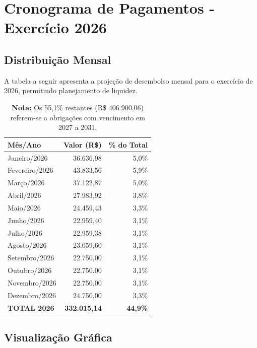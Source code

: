 \documentclass[12pt, a4paper]{article}
\newcommand{\reais}[1]{R\$ #1}
\begin{document}
\newpage

\section{Cronograma de Pagamentos - Exercício 2026}

\subsection{Distribuição Mensal}

A tabela a seguir apresenta a projeção de desembolso mensal para o exercício de 2026, permitindo planejamento de liquidez.

\begin{table}[H]
    \centering
    \renewcommand{\arraystretch}{1.3}
    \begin{tabularx}{0.85\textwidth}{X r r}
        \toprule
        \rowcolor{tableHeader} \textbf{Mês/Ano} & \textbf{Valor (R\$)} & \textbf{\% do Total} \\
        \midrule
        Janeiro/2026 & 36.636,98 & 5,0\% \\
        Fevereiro/2026 & 43.833,56 & 5,9\% \\
        Março/2026 & 37.122,87 & 5,0\% \\
        Abril/2026 & 27.983,92 & 3,8\% \\
        Maio/2026 & 24.459,43 & 3,3\% \\
        Junho/2026 & 22.959,40 & 3,1\% \\
        Julho/2026 & 22.959,38 & 3,1\% \\
        Agosto/2026 & 23.059,60 & 3,1\% \\
        Setembro/2026 & 22.750,00 & 3,1\% \\
        Outubro/2026 & 22.750,00 & 3,1\% \\
        Novembro/2026 & 22.750,00 & 3,1\% \\
        Dezembro/2026 & 24.750,00 & 3,3\% \\
        \midrule
        \rowcolor{lightGray} \textbf{TOTAL 2026} & \textbf{332.015,14} & \textbf{44,9\%} \\
        \bottomrule
    \end{tabularx}
    \caption*{\footnotesize \textbf{Nota:} Os 55,1\% restantes (\reais{406.900,06}) referem-se a obrigações com vencimento em 2027 a 2031.}
\end{table}

\subsection{Visualização Gráfica}
\end{document}
